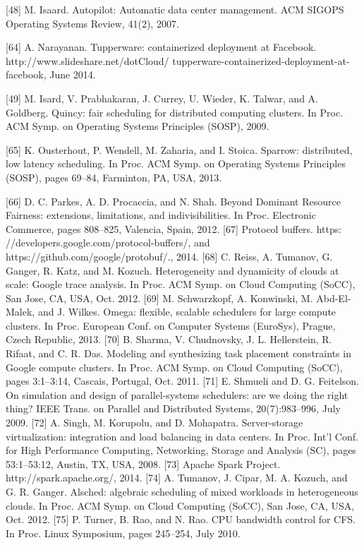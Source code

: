 [48] M. Isaard. Autopilot: Automatic data center management.
ACM SIGOPS Operating Systems Review, 41(2), 2007.

[64] A. Narayanan. Tupperware: containerized deployment at
Facebook. http://www.slideshare.net/dotCloud/
tupperware-containerized-deployment-at-facebook,
June 2014.

[49] M. Isard, V. Prabhakaran, J. Currey, U. Wieder, K. Talwar,
and A. Goldberg. Quincy: fair scheduling for distributed
computing clusters. In Proc. ACM Symp. on Operating
Systems Principles (SOSP), 2009.

[65] K. Ousterhout, P. Wendell, M. Zaharia, and I. Stoica.
Sparrow: distributed, low latency scheduling. In Proc. ACM
Symp. on Operating Systems Principles (SOSP), pages
69–84, Farminton, PA, USA, 2013.


[66] D. C. Parkes, A. D. Procaccia, and N. Shah. Beyond
Dominant Resource Fairness: extensions, limitations, and
indivisibilities. In Proc. Electronic Commerce, pages
808–825, Valencia, Spain, 2012.
[67] Protocol buffers. https:
//developers.google.com/protocol-buffers/, and
https://github.com/google/protobuf/., 2014.
[68] C. Reiss, A. Tumanov, G. Ganger, R. Katz, and M. Kozuch.
Heterogeneity and dynamicity of clouds at scale: Google
trace analysis. In Proc. ACM Symp. on Cloud Computing
(SoCC), San Jose, CA, USA, Oct. 2012.
[69] M. Schwarzkopf, A. Konwinski, M. Abd-El-Malek, and
J. Wilkes. Omega: flexible, scalable schedulers for large
compute clusters. In Proc. European Conf. on Computer
Systems (EuroSys), Prague, Czech Republic, 2013.
[70] B. Sharma, V. Chudnovsky, J. L. Hellerstein, R. Rifaat, and
C. R. Das. Modeling and synthesizing task placement
constraints in Google compute clusters. In Proc. ACM Symp.
on Cloud Computing (SoCC), pages 3:1–3:14, Cascais,
Portugal, Oct. 2011.
[71] E. Shmueli and D. G. Feitelson. On simulation and design of
parallel-systems schedulers: are we doing the right thing?
IEEE Trans. on Parallel and Distributed Systems,
20(7):983–996, July 2009.
[72] A. Singh, M. Korupolu, and D. Mohapatra. Server-storage
virtualization: integration and load balancing in data centers.
In Proc. Int’l Conf. for High Performance Computing,
Networking, Storage and Analysis (SC), pages 53:1–53:12,
Austin, TX, USA, 2008.
[73] Apache Spark Project. http://spark.apache.org/, 2014.
[74] A. Tumanov, J. Cipar, M. A. Kozuch, and G. R. Ganger.
Alsched: algebraic scheduling of mixed workloads in
heterogeneous clouds. In Proc. ACM Symp. on Cloud
Computing (SoCC), San Jose, CA, USA, Oct. 2012.
[75] P. Turner, B. Rao, and N. Rao. CPU bandwidth control for
CFS. In Proc. Linux Symposium, pages 245–254, July 2010.

